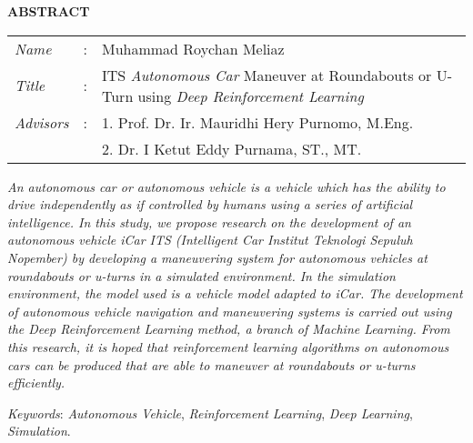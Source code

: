 \begin{center}
  \large\textbf{ABSTRACT}
\end{center}


\vspace{2ex}

\begingroup
  \setlength{\tabcolsep}{0pt}

  \noindent
  \begin{tabularx}{\textwidth}{l >{\centering}m{3em} X}
    \emph{Name}     &:& Muhammad Roychan Meliaz \\

    \emph{Title}    &:& ITS \textit{Autonomous Car} Maneuver at Roundabouts or U-Turn using \textit{Deep Reinforcement Learning} \\

    \emph{Advisors} &:& 1. Prof. Dr. Ir. Mauridhi Hery Purnomo, M.Eng. \\
                    & & 2. Dr. I Ketut Eddy Purnama, ST., MT. \\
  \end{tabularx}
\endgroup

\emph{An autonomous car or autonomous vehicle is a vehicle
	which has the ability to drive independently as if controlled by humans using a series of artificial intelligence. In this study, we propose research on the development of an autonomous vehicle iCar ITS (Intelligent Car Institut Teknologi Sepuluh Nopember) by developing a maneuvering system for autonomous vehicles at roundabouts or u-turns in a simulated environment. In the simulation environment, the model used is a vehicle model adapted to iCar. The development of autonomous vehicle navigation and maneuvering systems is carried out using the Deep Reinforcement Learning method, a branch of Machine Learning. From this research, it is hoped that reinforcement learning algorithms on autonomous cars can be produced that are able to maneuver at roundabouts or u-turns efficiently.}

\emph{Keywords}: \emph{Autonomous Vehicle}, \emph{Reinforcement Learning}, \emph{Deep Learning}, \emph{Simulation}.
